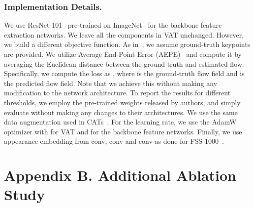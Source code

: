 \subsubsection{Implementation Details.}
We use ResNet-101~\cite{he2016deep} pre-trained on ImageNet~\cite{deng2009imagenet} for the backbone feature extraction networks. We leave all the components in VAT unchanged. However, we build a different objective function. As in~\cite{min2019hyperpixel,min2020learning,min2021convolutional}, we assume  ground-truth keypoints are provided. We utilize Average End-Point Error (AEPE)~\cite{truong2020glu} and compute it by averaging the Euclidean distance between the ground-truth and estimated flow. Specifically, we compute the loss as , where  is the ground-truth flow field and  is the predicted flow field. Note that we achieve this without making any modification to the network architecture. To report the results for different  thresholds, we employ the pre-trained weights released by authors, and simply evaluate without making any changes to their architectures. We use the same data augmentation used in CATs~\cite{cho2021semantic}. For the learning rate, we use the AdamW~\cite{loshchilov2017decoupled} optimizer with  for VAT and  for the backbone feature networks. Finally, we use appearance embedding from conv, conv and conv as done for FSS-1000~\cite{li2020fss}.

\vspace{-10pt}


\section*{Appendix B. Additional Ablation Study} 

